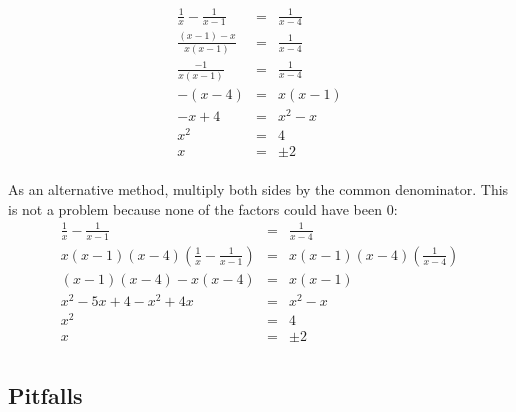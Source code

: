 \documentclass[letterpaper,12pt,fleqn]{article}
\begin{document}
\begin{example}
  \listbreak
  \begin{eqnarray*}
    \frac{1}{x}-\frac{1}{x-1} &=& \frac{1}{x-4} \\
    \frac{(x-1)-x}{x(x-1)} &=& \frac{1}{x-4} \\
    \frac{-1}{x(x-1)} &=& \frac{1}{x-4} \\
    -(x-4) &=& x(x-1) \\
    -x+4 &=& x^2-x \\
    x^2 &=& 4 \\
    x &=& \pm2 \\
  \end{eqnarray*}

  As an alternative method, multiply both sides by the common denominator. This
  is not a problem because none of the factors could have been 0:
  \begin{eqnarray*}
    \frac{1}{x}-\frac{1}{x-1} &=& \frac{1}{x-4} \\
    x(x-1)(x-4)\left(\frac{1}{x}-\frac{1}{x-1}\right) &=&
    x(x-1)(x-4)\left(\frac{1}{x-4}\right) \\
    (x-1)(x-4)-x(x-4) &=& x(x-1) \\
    x^2-5x+4-x^2+4x &=& x^2-x \\
    x^2 &=& 4 \\
    x &=& \pm2 \\
  \end{eqnarray*}
\end{example}

\subsection*{Pitfalls}
\end{document}
